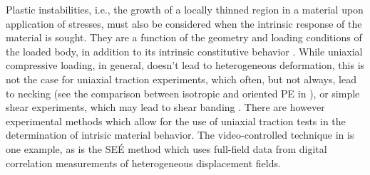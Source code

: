Plastic instabilities, i.e., the growth of a locally thinned region in a material upon application of stresses, must also be considered when the intrinsic response of the material is sought.
They are a function of the geometry and loading conditions of the loaded body, in addition to its intrinsic constitutive behavior \citep{wardIntroductionMechanicalProperties2004}.
While uniaxial compressive loading, in general, doesn't lead to heterogeneous deformation, this is not the case for uniaxial traction experiments, which often, but not always, lead to necking (see the comparison between isotropic and oriented PE in \cite{naViscousForceDominatedTensileDeformation2006}), or simple shear experiments, which may lead to shear banding \citep{gsellApplicationPlaneSimple1983}.
There are however experimental methods which allow for the use of uniaxial traction tests in the determination of intrisic material behavior.
The video-controlled technique in \citep{gsellVideocontrolledTensileTesting1992} is one example, as is the SEÉ method \citep{lauroSEEMethodDetermination2010, balieuDamageHighStrain2015} which uses full-field data from digital correlation measurements of heterogeneous displacement fields.

